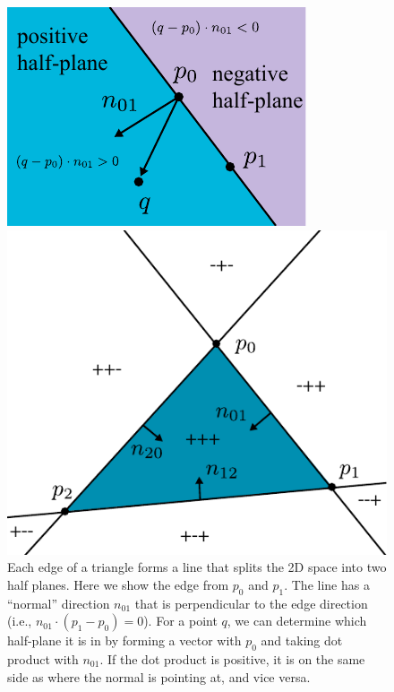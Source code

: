 \begin{figure}[t]
    \centering
    \begin{minipage}{0.5\linewidth}
    \includegraphics[width=\linewidth]{imgs/half_planes.pdf}
    \caption{Each edge of a triangle forms a line that splits the 2D space into two half planes. Here we show the edge from $p_0$ and $p_1$. The line has a ``normal'' direction $n_{01}$ that is perpendicular to the edge direction (i.e., $n_{01} \cdot \left(p_1 - p_0\right) = 0$). For a point $q$, we can determine which half-plane it is in by forming a vector with $p_0$ and taking dot product with $n_{01}$. If the dot product is positive, it is on the same side as where the normal is pointing at, and vice versa.}
    \label{fig:half_planes}
    \end{minipage}
    \hspace{20pt}
    \begin{minipage}{0.39\linewidth}
    \includegraphics[width=\linewidth]{imgs/tri_half_planes.pdf}

\end{minipage}
\end{figure}
